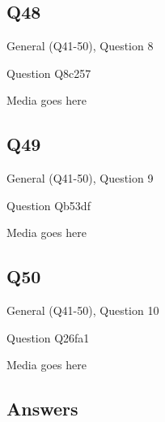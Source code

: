 \documentclass[11pt]{beamer}
\begin{document}
\subsection*{Q48}
\begin{frame}[t]{General (Q41-50), Question 8}
\vspace{2em}
\begin{block}{Question}
Q8c257
\end{block}
\begin{center}
Media goes here
\end{center}
\end{frame}
    

\subsection*{Q49}
\begin{frame}[t]{General (Q41-50), Question 9}
\vspace{2em}
\begin{block}{Question}
Qb53df
\end{block}
\begin{center}
Media goes here
\end{center}
\end{frame}
    

\subsection*{Q50}
\begin{frame}[t]{General (Q41-50), Question 10}
\vspace{2em}
\begin{block}{Question}
Q26fa1
\end{block}
\begin{center}
Media goes here
\end{center}
\end{frame}
    
\subsection{Answers}
\end{document}
